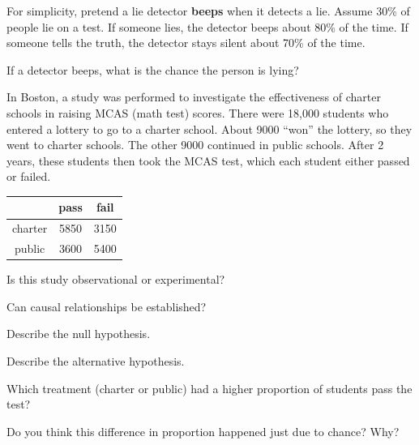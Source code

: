 \documentclass[12pt,letterpaper,addpoints]{exam}
\begin{document}
\newpage
{}
\begin{questions}
\question[10] For simplicity, pretend a lie detector {\bf beeps} when it detects a lie. Assume 30\% of people lie on a test. If someone lies, the detector beeps about 80\% of the time. If someone tells the truth, the detector stays silent about 70\% of the time.

If a detector beeps, what is the chance the person is lying?

\newpage

\question[10] In Boston, a study was performed to investigate the effectiveness of charter schools in raising MCAS (math test) scores. There were 18,000 students who entered a lottery to go to a charter school. About 9000 ``won'' the lottery, so they went to charter schools. The other 9000 continued in public schools. After 2 years, these students then took the MCAS test, which each student either passed or failed.
\begin{center}
\begin{tabular}{|c|c c|} \hline
        & pass & fail \\ \hline
charter & 5850 & 3150 \\
public  & 3600 & 5400 \\ \hline
\end{tabular}
\end{center}
\begin{parts}
\item Is this study observational or experimental?
\vfill
\item Can causal relationships be established?
\vfill
\item Describe the null hypothesis.
\vfill
\item Describe the alternative hypothesis.
\vfill
\item Which treatment (charter or public) had a higher proportion of students pass the test?
\vfill
\item Do you think this difference in proportion happened just due to chance? Why?
\vfill
\end{parts}


\end{questions}
\end{document}
